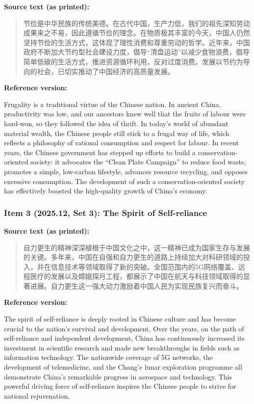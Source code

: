 \noindent\textbf{Source text (as printed):}
\begin{quote}
节俭是中华民族的传统美德。在古代中国，生产力低，我们的祖先深知劳动成果来之不易，因此遵循节俭的理念。在物质极其丰富的今天，中国人仍然坚持节俭的生活方式，这体现了理性消费和尊重劳动的哲学。近年来，中国政府不断加大节约型社会建设力度，倡导“清盘运动”以减少食物浪费，倡导简单低碳的生活方式，推进资源循环利用，反对过度消费。发展以节约为导向的社会，已切实推动了中国经济的高质量发展。
\end{quote}

\noindent\textbf{Reference version:}
\par\smallskip
\noindent Frugality is a traditional virtue of the Chinese nation. In ancient China, productivity was low, and our ancestors knew well that the fruits of labour were hard-won, so they followed the idea of thrift. In today's world of abundant material wealth, the Chinese people still stick to a frugal way of life, which reflects a philosophy of rational consumption and respect for labour. In recent years, the Chinese government has stepped up efforts to build a conservation-oriented society: it advocates the ``Clean Plate Campaign'' to reduce food waste, promotes a simple, low-carbon lifestyle, advances resource recycling, and opposes excessive consumption. The development of such a conservation-oriented society has effectively boosted the high-quality growth of China's economy.
\par\medskip

\subsubsection*{Item 3 (2025.12, Set 3): The Spirit of Self-reliance}

\noindent\textbf{Source text (as printed):}
\begin{quote}
自力更生的精神深深植根于中国文化之中，这一精神已成为国家生存与发展的关键。多年来，中国在自强和自力更生的道路上持续加大对科研领域的投入，并在信息技术等领域取得了新的突破。全国范围内的5G网络覆盖、远程医疗的发展以及嫦娥探月工程，都展示了中国在航天与科技领域取得的显著进展。自力更生这一强大动力激励着中国人民为实现民族复兴而奋斗。
\end{quote}

\noindent\textbf{Reference version:}
\par\smallskip
\noindent The spirit of self-reliance is deeply rooted in Chinese culture and has become crucial to the nation's survival and development. Over the years, on the path of self-reliance and independent development, China has continuously increased its investment in scientific research and made new breakthroughs in fields such as information technology. The nationwide coverage of 5G networks, the development of telemedicine, and the Chang'e lunar exploration programme all demonstrate China's remarkable progress in aerospace and technology. This powerful driving force of self-reliance inspires the Chinese people to strive for national rejuvenation.
\par\medskip

